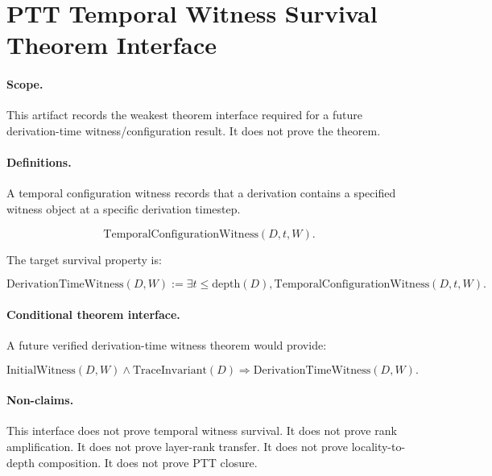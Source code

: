 \section{PTT Temporal Witness Survival Theorem Interface}

\paragraph{Scope.}
This artifact records the weakest theorem interface required for a future
derivation-time witness/configuration result. It does not prove the theorem.

\paragraph{Definitions.}

A temporal configuration witness records that a derivation contains a
specified witness object at a specific derivation timestep.

\[
\mathrm{TemporalConfigurationWitness}(D,t,W).
\]

The target survival property is:

\[
\mathrm{DerivationTimeWitness}(D,W)
:=
\exists t \leq \mathrm{depth}(D),
\mathrm{TemporalConfigurationWitness}(D,t,W).
\]

\paragraph{Conditional theorem interface.}

A future verified derivation-time witness theorem would provide:

\[
\mathrm{InitialWitness}(D,W)
\land
\mathrm{TraceInvariant}(D)
\Longrightarrow
\mathrm{DerivationTimeWitness}(D,W).
\]

\paragraph{Non-claims.}

This interface does not prove temporal witness survival.
It does not prove rank amplification.
It does not prove layer-rank transfer.
It does not prove locality-to-depth composition.
It does not prove PTT closure.
